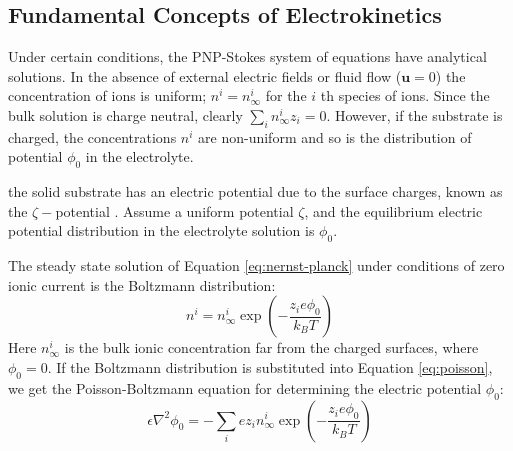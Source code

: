 %

\subsection{Fundamental Concepts of Electrokinetics}
Under certain conditions, the PNP-Stokes system of equations have analytical solutions. In the absence of external electric fields or fluid flow ($\mathbf{u}=0$) the concentration of ions is uniform; $n^i = n_\infty^i$ for the $i$ th species of ions. Since the bulk solution is charge neutral, clearly $\sum_{i} n_\infty^i z_i = 0$. However, if the substrate is charged, the concentrations $n^i$ are non-uniform and so is the distribution of potential $\phi_0$ in the electrolyte.  



 the solid substrate has an electric potential due to the surface charges, known 
as the $\zeta-$potential \cite{kirby2004zeta,kirby2004zeta2}. Assume a uniform potential $\zeta$, and the equilibrium electric potential distribution in the electrolyte solution is $\phi_0$. 


The steady state solution of Equation \ref{eq:nernst-planck} under conditions of zero ionic current is the 
Boltzmann distribution:
\begin{equation}
n^i = n_\infty^i \exp \left( -\frac{z_i e \phi_0}{k_BT} \right)
\end{equation}
Here $n_\infty^i$ is the bulk ionic concentration far from the charged surfaces, where $\phi_0=0$.
If the Boltzmann distribution is substituted into Equation \ref{eq:poisson}, we get the Poisson-Boltzmann equation for determining the electric potential $\phi_0$:
\begin{equation}
\epsilon \nabla^2\phi_0 = -  \sum_i e z_i n_\infty^i \exp \left( -\frac{z_i e \phi_0}{k_BT} \right) 
\label{eq:poisson-boltzmann}
\end{equation}

